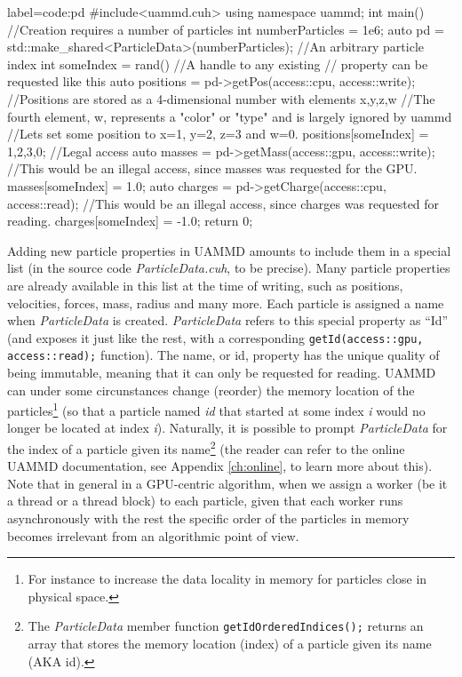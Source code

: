 \documentclass[ twoside,openright,titlepage,numbers=noenddot,%
headinclude,footinclude,cleardoublepage=empty,abstract=on,
BCOR=5mm,paper=a4,fontsize=11pt, dvipsnames
]{scrreprt}
\def\ucpp{uammd_cpp_lexer.py:UAMMDCppLexer -x}
\newcommand{\uammd}{\gls{UAMMD}\xspace}
\begin{document}
\begin{code2}
  {label=code:pd}
#include<uammd.cuh>
using namespace uammd; 
int main(){
  //Creation requires a number of particles
  int numberParticles = 1e6;
  auto pd = std::make_shared<ParticleData>(numberParticles);
  //An arbitrary particle index
  int someIndex = rand()%
  //A handle to any existing 
  // property can be requested like this
  auto positions = pd->getPos(access::cpu, access::write);
  //Positions are stored as a 4-dimensional number with elements x,y,z,w
  //The fourth element, w, represents a "color" or "type" and is largely ignored by uammd
  //Lets set some position to x=1, y=2, z=3 and w=0.
  positions[someIndex] = {1,2,3,0}; //Legal access
  auto masses = pd->getMass(access::gpu, access::write);
  //This would be an illegal access, since masses was requested for the GPU.
  masses[someIndex] = 1.0;
  auto charges = pd->getCharge(access::cpu, access::read);
  //This would be an illegal access, since charges was requested for reading.
  charges[someIndex] = -1.0;
  return 0;
}
\end{code2}
Adding new particle properties in \uammd amounts to include them in a special list (in the source code \emph{ParticleData.cuh}, to be precise). Many particle properties are already available in this list at the time of writing, such as positions, velocities, forces, mass, radius and many more. Each particle is assigned a name when \emph{ParticleData} is created. \emph{ParticleData} refers to this special property as ``Id'' (and exposes it just like the rest, with a corresponding \texttt{getId(access::gpu, access::read);} function). The name, or id, property has the unique quality of being immutable, meaning that it can only be requested for reading. \uammd can under some circunstances change (reorder) the memory location of the particles\footnote{For instance to increase the data locality in memory for particles close in physical space.} (so that a particle named \emph{id} that started at some index \emph{i} would no longer be located at index \emph{i}). Naturally, it is possible to prompt \emph{ParticleData} for the index of a particle given its name\footnote{The \emph{ParticleData} member function \texttt{getIdOrderedIndices();} returns an array that stores the memory location (index) of a particle given its name (AKA id).} (the reader can refer to the online \uammd documentation, see Appendix \ref{ch:online}, to learn more about this). Note that in general in a GPU-centric algorithm, when we assign a worker (be it a thread or a thread block) to each particle, given that each worker runs asynchronously with the rest the specific order of the particles in memory becomes irrelevant from an algorithmic point of view.
\end{document}
